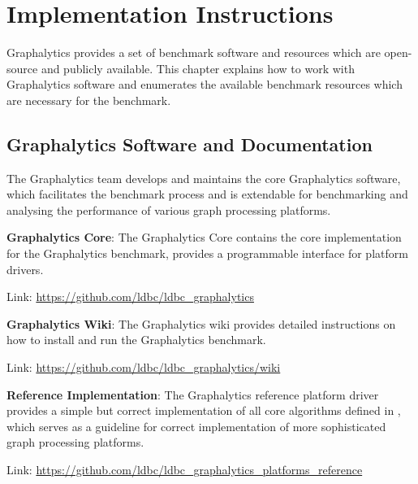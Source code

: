 \chapter{Implementation Instructions}
\label{chap:instructions}
Graphalytics provides a set of benchmark software and resources which are open-source and publicly available. This chapter explains how to work with Graphalytics software and enumerates the available benchmark resources which are necessary for the benchmark.



\section{Graphalytics Software and Documentation}\label{sec:instructions:core}
The Graphalytics team develops and maintains the core Graphalytics software, which facilitates the benchmark process and is extendable for benchmarking and analysing the performance of various graph processing platforms.

\textbf{Graphalytics Core}: The Graphalytics Core contains the core implementation for the Graphalytics benchmark, provides a programmable interface for platform drivers.

\qquad Link: \url{https://github.com/ldbc/ldbc_graphalytics}


\textbf{Graphalytics Wiki}: The Graphalytics wiki provides detailed instructions on how to install and run the Graphalytics benchmark.

\qquad Link: \url{https://github.com/ldbc/ldbc_graphalytics/wiki}




\textbf{Reference Implementation}: The Graphalytics reference platform driver provides a simple but correct implementation of all core algorithms defined in , which serves as a guideline for correct implementation of more sophisticated graph processing platforms.

\qquad Link: \url{https://github.com/ldbc/ldbc_graphalytics_platforms_reference}









